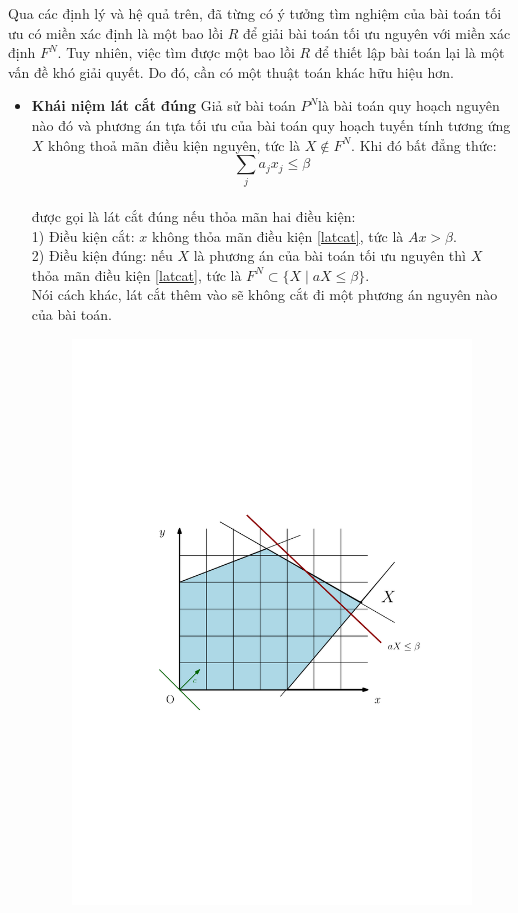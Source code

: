 \documentclass[12pt,a4paper]{report}
\begin{document}
Qua các định lý và hệ quả trên, đã từng có ý tưởng tìm nghiệm của bài toán tối ưu có miền xác định là một bao lồi $R$ để giải bài toán tối ưu nguyên với miền xác định $F^N$. Tuy nhiên, việc tìm được một bao lồi $R$ để thiết lập bài toán lại là một vấn đề khó giải quyết. Do đó, cần có một thuật toán khác hữu hiệu hơn.\\ 
\begin{itemize}
    \item \textbf{Khái niệm lát cắt đúng}
    Giả sử bài toán $P^N$là bài toán quy hoạch nguyên nào đó và phương án tựa tối ưu của bài toán quy hoạch tuyến tính tương ứng $X$ không thoả mãn điều kiện 
nguyên, tức là $X \notin  F^N$. Khi đó bất đẳng thức:
    $$\sum _j a_jx_j \le \beta$$\label{latcat}\\
    được gọi là lát cắt đúng nếu thỏa mãn hai điều kiện:\\
    1) Điều kiện cắt: $x$ không thỏa mãn điều kiện \eqref{latcat}, tức là $Ax > \beta$.\\
    2) Điều kiện đúng: nếu $X$ là phương án của bài toán tối ưu nguyên thì $X$ thỏa mãn điều kiện \eqref{latcat}, tức là 
 $F^N \subset \{X\mid aX\le \beta\}$.\\
    Nói cách khác, lát cắt thêm vào sẽ không cắt đi một phương án nguyên nào của bài toán.\\
    
    
    \begin{figure}[h]
        \centering
        \includegraphics[width=0.6\linewidth]{anh2 (1).pdf}
       

\end{figure}
\end{itemize}
\end{document}
